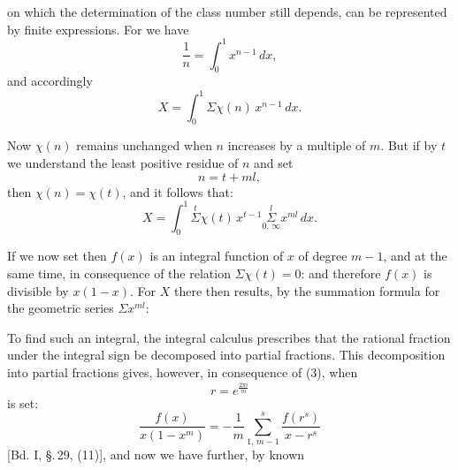 on which the determination of the class number still depends, can be
represented by finite expressions. For we have
\[
\frac{1}{n} = \int_0^1 x^{n-1}\,dx,
\]
and accordingly
\[
X = \int_0^1 \Sigma \chi(n)\,x^{n-1}\,dx.
\]

Now $\chi(n)$ remains unchanged when $n$ increases by a multiple of $m$.
But if by $t$ we understand the least positive residue of $n$ and set
\[
n = t + ml,
\]
then $\chi(n) = \chi(t)$, and it follows that:
\[
X = \int_0^1 \overset{t}{\Sigma} \chi(t)\,x^{t-1} \underset{0,\,\infty}{\overset{l}{\Sigma}} x^{ml}\,dx.
\]

If we now set
then $f(x)$ is an integral function of $x$ of degree $m-1$, and at the same
time, in consequence of the relation $\Sigma \chi(t) = 0$:
and therefore $f(x)$ is divisible by $x(1-x)$. For $X$ there then results,
by the summation formula for the geometric series $\Sigma x^{ml}$:

To find such an integral, the integral calculus prescribes that the
rational fraction under the integral sign be decomposed into partial fractions.
This decomposition into partial fractions gives, however, in consequence of (3), when
\[
r = e^{\frac{2\pi i}{m}}
\]
is set:
\[
\frac{f(x)}{x(1-x^m)} = -\frac{1}{m} \sum\limits_{1,\,m-1}^{s} \frac{f(r^s)}{x-r^s}
\]
[Bd. I, \S.\,29, (11)], and now we have further, by known
